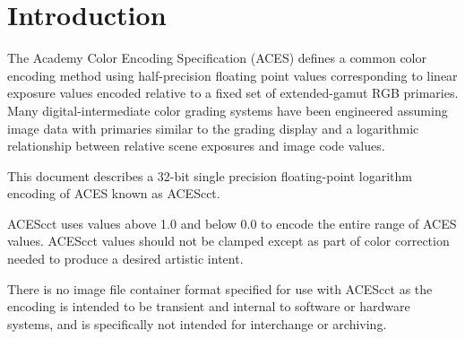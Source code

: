 \unnumberedformat	    %
\chapter{Introduction} 	%

The Academy Color Encoding Specification (ACES) defines a common color encoding method using half-precision floating point values corresponding to linear exposure values encoded relative to a fixed set of extended-gamut RGB primaries. Many digital-intermediate color grading systems have been engineered assuming image data with primaries similar to the grading display and a logarithmic relationship between relative scene exposures and image code values.

This document describes a 32-bit single precision floating-point logarithm encoding of ACES known as ACEScct.

ACEScct uses values above 1.0 and below 0.0 to encode the entire range of ACES values. ACEScct values should not be clamped except as part of color correction needed to produce a desired artistic intent.

There is no image file container format specified for use with ACEScct as the encoding is intended to be transient and internal to software or hardware systems, and is specifically not intended for interchange or archiving.